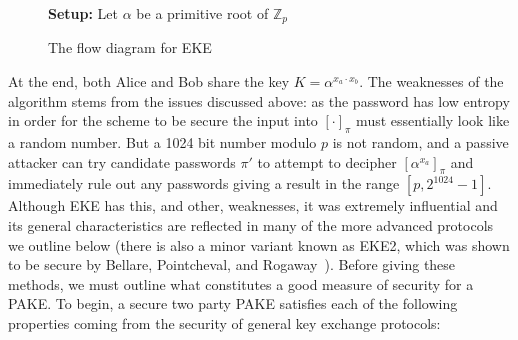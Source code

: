 \documentclass{amsart}
\theoremstyle{remark}
\begin{document}
\begin{figure}[h]
\textbf{Setup:} Let $\alpha$ be a primitive root of $\mathbb{Z}_p$
    \caption{The flow diagram for EKE}
    \label{fig:EKE}
\end{figure}

At the end, both Alice and Bob share the key $K = \alpha^{x_a \cdot x_b}$.  The weaknesses of the algorithm 
stems from the issues discussed above: as the password has low entropy in order for the scheme to be 
secure the input into $[\cdot]_{\pi}$ must essentially look like a random number.  But a 1024 bit number 
modulo $p$ is not random, and a passive attacker can try candidate passwords $\pi'$ to attempt to decipher 
$\left[\alpha^{x_a}\right]_{\pi}$ and immediately rule out any passwords giving a result in the range $[p,2^{1024}-1]$.
\\

Although EKE has this, and other, weaknesses, it was extremely influential and its general characteristics are 
reflected in many of the more advanced protocols we outline below (there is also a minor variant known as EKE2,
which was shown to be secure by Bellare, Pointcheval, and Rogaway~\cite{BePoRo00}).  Before giving these methods, we must outline 
what constitutes a good measure of security for a PAKE. To begin, a secure two party PAKE satisfies each of the following properties
coming from the security of general key exchange protocols:
\\
\end{document}
